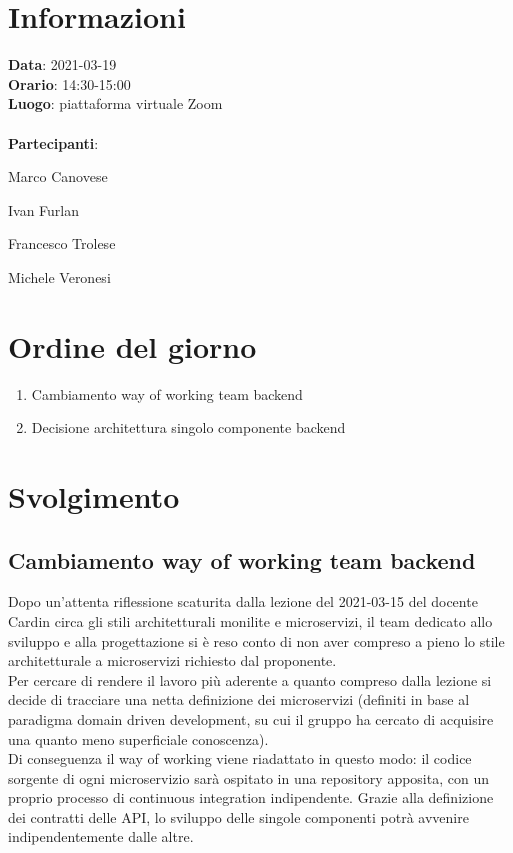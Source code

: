 \section{Informazioni}
\textbf{Data}: 2021-03-19 \\
\textbf{Orario}: 14:30-15:00 \\
\textbf{Luogo}: piattaforma virtuale Zoom \\\\
\textbf{Partecipanti}:\begin{list}{*}{\setlength{\itemsep}{0cm}}
	\item Marco Canovese
	\item Ivan Furlan
	\item Francesco Trolese
	\item Michele Veronesi
\end{list}

\section{Ordine del giorno}
\begin{enumerate}
	\item Cambiamento way of working team backend
	\item Decisione architettura singolo componente backend
\end{enumerate}

\section{Svolgimento}
\subsection{Cambiamento way of working team backend}
Dopo un'attenta riflessione scaturita dalla lezione del 2021-03-15 del docente Cardin circa gli stili architetturali monilite e microservizi,
il team dedicato allo sviluppo e alla progettazione si è reso conto di non aver compreso a pieno lo stile architetturale a microservizi richiesto dal proponente.\\
Per cercare di rendere il lavoro più aderente a quanto compreso dalla lezione si decide di tracciare una netta definizione dei microservizi (definiti in base al paradigma
domain driven development, su cui il gruppo ha cercato di acquisire una quanto meno superficiale conoscenza).\\
Di conseguenza il way of working viene riadattato in questo modo: il codice sorgente di ogni microservizio sarà ospitato in una repository apposita, con un proprio processo di
continuous integration indipendente. Grazie alla definizione dei contratti delle API, lo sviluppo delle singole componenti potrà avvenire indipendentemente dalle altre.


